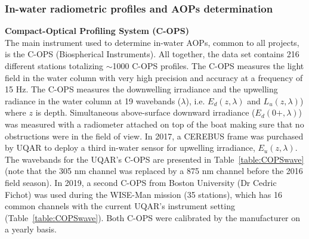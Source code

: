 \documentclass[essd, manuscript]{copernicus}
\begin{document}
\subsubsection{In-water radiometric profiles and AOPs determination}

\textbf{Compact-Optical Profiling System (C-OPS)}\\
The main instrument used to determine in-water AOPs, common to all projects, is the C-OPS (Biospherical Instruments)\citep{Hooker2013, Morrow2010}. All together, the data set contains 216 different stations totalizing $\sim$1000 C-OPS profiles. The C-OPS measures the light field in the water column with very high precision and accuracy at a frequency of 15 Hz. The C-OPS  measures the downwelling irradiance and the upwelling radiance in the water column at 19 wavebands ($\lambda$), i.e. $E_d(z,\lambda)$ and  $L_u(z,\lambda)$) where $z$ is depth. Simultaneous above-surface downward irradiance ($E_d(0+, \lambda)$) was measured with a radiometer attached on top of the boat making sure that no obstructions were in the field of view. In 2017, a CEREBUS frame was purchased by UQAR to deploy a third in-water sensor for upwelling irradiance, $E_u(z,\lambda)$. The wavebands for the UQAR's C-OPS are presented in Table~\ref{table:COPSwave} (note that the 305 nm channel was replaced by a 875 nm channel before the 2016 field season).  In 2019, a second C-OPS from Boston University (Dr Cedric Fichot) was used during the WISE-Man mission (35 stations), which has 16 common channels with the current UQAR's instrument setting (Table~\ref{table:COPSwave}). Both C-OPS were calibrated by the manufacturer on a yearly basis. 
\end{document}
